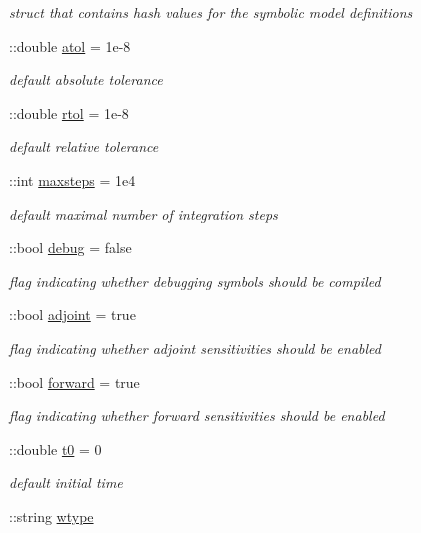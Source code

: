 \begin{DoxyCompactItemize}
\begin{DoxyCompactList}\small\item\em struct that contains hash values for the symbolic model definitions \end{DoxyCompactList}\item 
\+::double \hyperlink{classamimodel_a0c5f3dcf809a17b895fe12fc91272349}{atol} = 1e-\/8
\begin{DoxyCompactList}\small\item\em default absolute tolerance \end{DoxyCompactList}\item 
\+::double \hyperlink{classamimodel_a7978e9a4674f869e6b2950e2f6262ca5}{rtol} = 1e-\/8
\begin{DoxyCompactList}\small\item\em default relative tolerance \end{DoxyCompactList}\item 
\+::int \hyperlink{classamimodel_ac37622882dacee1f11688d4941ccb45e}{maxsteps} = 1e4
\begin{DoxyCompactList}\small\item\em default maximal number of integration steps \end{DoxyCompactList}\item 
\+::bool \hyperlink{classamimodel_a0514aabed091ee5e2f35766eb01eced6}{debug} = false
\begin{DoxyCompactList}\small\item\em flag indicating whether debugging symbols should be compiled \end{DoxyCompactList}\item 
\+::bool \hyperlink{classamimodel_ab6d500b41cf50693452415caca31d32e}{adjoint} = true
\begin{DoxyCompactList}\small\item\em flag indicating whether adjoint sensitivities should be enabled \end{DoxyCompactList}\item 
\+::bool \hyperlink{classamimodel_a81e42e48c9c72814166c8f7cd414ce24}{forward} = true
\begin{DoxyCompactList}\small\item\em flag indicating whether forward sensitivities should be enabled \end{DoxyCompactList}\item 
\+::double \hyperlink{classamimodel_abdb5a42ffee3ca622484b53a322f1004}{t0} = 0
\begin{DoxyCompactList}\small\item\em default initial time \end{DoxyCompactList}\item 
\hypertarget{classamimodel_a5376250224ce32fb558d88aa0b5a93ff}{}\+::string \hyperlink{classamimodel_a5376250224ce32fb558d88aa0b5a93ff}{wtype}\label{classamimodel_a5376250224ce32fb558d88aa0b5a93ff}


\end{DoxyCompactItemize}

